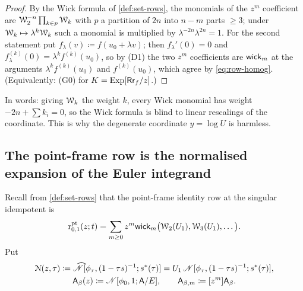 \begin{proof}
By the Wick formula of \cref{def:set-rows}, the monomials of the $z^m$ coefficient are $\mathcal{W}_2^{-n}\prod_{k\in p}\mathcal{W}_k$ with $p$ a partition of $2n$ into $n-m$ parts $\geq3$; under $\mathcal{W}_k\mapsto\lambda^k\mathcal{W}_k$ such a monomial is multiplied by $\lambda^{-2n}\lambda^{2n}=1$. For the second statement put $f_\lambda(v)\coloneqq f(u_0+\lambda v)$; then $f_\lambda'(0)=0$ and $f_\lambda^{(k)}(0)=\lambda^kf^{(k)}(u_0)$, so by (D1) the two $z^m$ coefficients are $\mathsf{wick}_m$ at the arguments $\lambda^kf^{(k)}(u_0)$ and $f^{(k)}(u_0)$, which agree by \eqref{eq:row-homog}. (Equivalently: (G0) for $K=\mathrm{Exp}[\mathsf{Rr}_f/z]$.)
\end{proof}

In words: giving $\mathcal{W}_k$ the weight $k$, every Wick monomial has weight $-2n+\sum k_i=0$, so the Wick formula is blind to linear rescalings of the coordinate. This is why the degenerate coordinate $y=\log U$ is harmless.

\subsection{The point-frame row is the normalised expansion of the Euler integrand}
\label{sec:row-wickrow}

Recall from \cref{def:set-rows} that the point-frame identity row at the singular idempotent is
\[
\mathrm{r}^{\mathrm{pt}}_{0,1}(z;t)=\sum_{m\geq0}z^m\mathsf{wick}_m\big(\mathcal{W}_2(U_1),\mathcal{W}_3(U_1),\dots\big).
\]
Put
\begin{equation}
\label{eq:row-Ndef}
\begin{gathered}
\mathcal{N}(z,\tau)\coloneqq\widehat{\mathscr{N}}[\phi_\tau,(1-\tau s)^{-1};s^{\ast}(\tau)]=U_1\,\mathscr{N}[\phi_\tau,(1-\tau s)^{-1};s^{\ast}(\tau)],\\
\mathsf{A}_{\beta}(z)\coloneqq\mathscr{N}[\phi_0,1;\mathsf{A}/E],\qquad \mathsf{A}_{\beta,m}\coloneqq[z^m]\mathsf{A}_{\beta} .
\end{gathered}
\end{equation}

